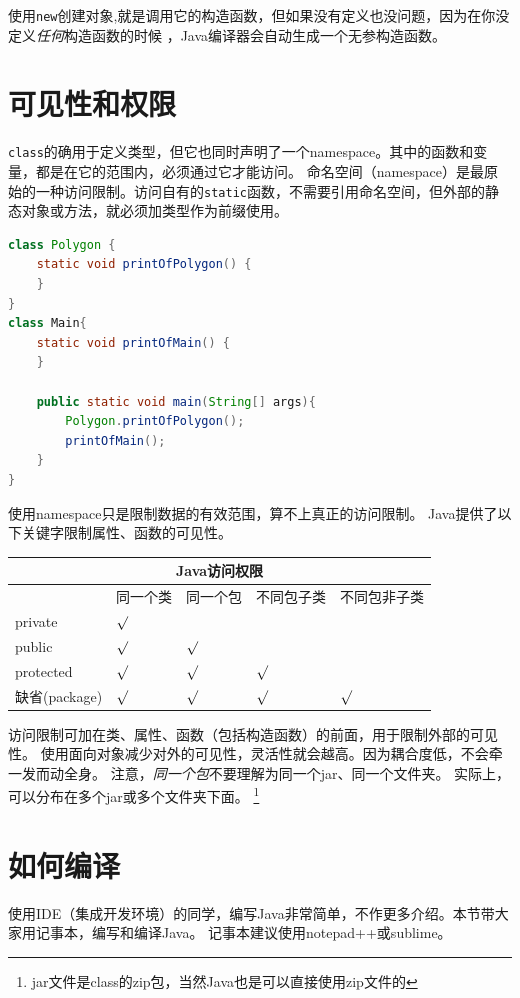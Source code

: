 使用\lstinline{new}创建对象,就是调用它的构造函数，但如果没有定义也没问题，因为在你没定义\emph{任何}构造函数的时候
，Java编译器会自动生成一个无参构造函数。


\section{可见性和权限}
\lstinline{class}的确用于定义类型，但它也同时声明了一个namespace。其中的函数和变量，都是在它的范围内，必须通过它才能访问。
命名空间（namespace）是最原始的一种访问限制。访问自有的\lstinline{static}函数，不需要引用命名空间，但外部的静态对象或方法，就必须加类型作为前缀使用。
\begin{lstlisting}[language=Java,mathescape]
class Polygon {
    static void printOfPolygon() {
    }
}
class Main{
    static void printOfMain() {
    }

    public static void main(String[] args){
        Polygon.printOfPolygon();
        printOfMain();
    }
}
\end{lstlisting}

使用namespace只是限制数据的有效范围，算不上真正的访问限制。
Java提供了以下关键字限制属性、函数的可见性。

\begin{table}[!htbp]\centering
\begin{tabular}{|p{3cm}|p{1.6cm}|p{1.6cm}|p{2cm}|p{2.4cm}|}
\hline
\multicolumn{5}{|c|}{Java访问权限}\\ \hline
&同一个类&同一个包&不同包子类&不同包非子类\\ \hline
private&$\surd$&&&\\ \hline
public&$\surd$&$\surd$&&\\\hline
protected&$\surd$&$\surd$&$\surd$&\\ \hline
缺省(package)&$\surd$&$\surd$&$\surd$&$\surd$\\ \hline
\end{tabular}
\label{table:part1_oo_protect}
\end{table}

访问限制可加在类、属性、函数（包括构造函数）的前面，用于限制外部的可见性。
使用面向对象减少对外的可见性，灵活性就会越高。因为耦合度低，不会牵一发而动全身。
注意，\emph{同一个包}不要理解为同一个jar、同一个文件夹。
实际上，可以分布在多个jar或多个文件夹下面。
\footnote{jar文件是class的zip包，当然Java也是可以直接使用zip文件的}


\section{如何编译}
使用IDE（集成开发环境）的同学，编写Java非常简单，不作更多介绍。本节带大家用记事本，编写和编译Java。
记事本建议使用notepad++或sublime。

